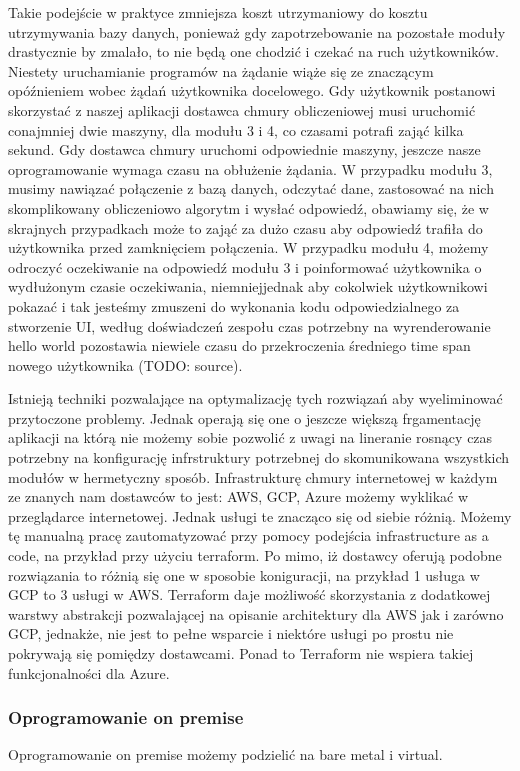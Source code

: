 Takie podejście w praktyce zmniejsza koszt utrzymaniowy do kosztu utrzymywania bazy danych, ponieważ gdy zapotrzebowanie na pozostałe moduły drastycznie by zmalało, to nie będą one chodzić i czekać na ruch użytkowników.
Niestety uruchamianie programów na żądanie wiąże się ze znaczącym opóźnieniem wobec żądań użytkownika docelowego.
Gdy użytkownik postanowi skorzystać z naszej aplikacji dostawca chmury obliczeniowej musi uruchomić conajmniej dwie maszyny, dla modułu 3 i 4, co czasami potrafi zająć kilka sekund.
Gdy dostawca chmury uruchomi odpowiednie maszyny, jeszcze nasze oprogramowanie wymaga czasu na obłużenie żądania.
W przypadku modułu 3, musimy nawiązać połączenie z bazą danych, odczytać dane, zastosować na nich skomplikowany obliczeniowo algorytm i wysłać odpowiedź, obawiamy się, że w skrajnych przypadkach może to zająć za dużo czasu aby odpowiedź trafiła do użytkownika przed zamknięciem połączenia.
W przypadku modułu 4, możemy odroczyć oczekiwanie na odpowiedź modułu 3 i poinformować użytkownika o wydłużonym czasie oczekiwania, niemniejjednak aby cokolwiek użytkownikowi pokazać i tak jesteśmy zmuszeni do wykonania kodu odpowiedzialnego za stworzenie UI, według doświadczeń zespołu czas potrzebny na wyrenderowanie hello world pozostawia niewiele czasu do przekroczenia średniego time span nowego użytkownika (TODO: source).

Istnieją techniki pozwalające na optymalizację tych rozwiązań aby wyeliminować przytoczone problemy.
Jednak operają się one o jeszcze większą frgamentację aplikacji na którą nie możemy sobie pozwolić z uwagi na lineranie rosnący czas potrzebny na konfigurację infrstruktury potrzebnej do skomunikowana wszystkich modułów w hermetyczny sposób.
Infrastrukturę chmury internetowej w każdym ze znanych nam dostawców to jest: AWS, GCP, Azure możemy wyklikać w przeglądarce internetowej.
Jednak usługi te znacząco się od siebie różnią.
Możemy tę manualną pracę zautomatyzować przy pomocy podejścia infrastructure as a code, na przykład przy użyciu terraform.
Po mimo, iż dostawcy oferują podobne rozwiązania to różnią się one w sposobie koniguracji, na przykład 1 usługa w GCP to 3 usługi w AWS.
Terraform daje możliwość skorzystania z dodatkowej warstwy abstrakcji pozwalającej na opisanie architektury dla AWS jak i zarówno GCP, jednakże, nie jest to pełne wsparcie i niektóre usługi po prostu nie pokrywają się pomiędzy dostawcami.
Ponad to Terraform nie wspiera takiej funkcjonalności dla Azure.

\subsubsection{Oprogramowanie on premise}
Oprogramowanie on premise możemy podzielić na bare metal i virtual.

